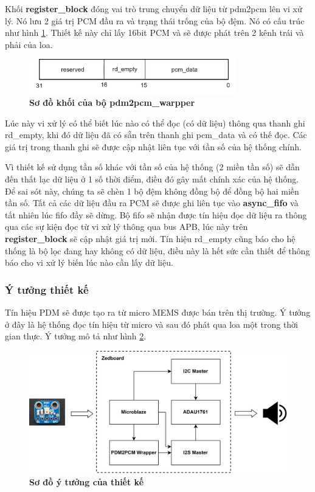 Khối \textbf{register\_block} đóng vai trò trung chuyển dữ liệu từ pdm2pcm lên vi xử lý. Nó lưu 2 giá trị PCM đầu ra và trạng thái trống của bộ đệm. Nó có cấu trúc như hình \ref{bit}. Thiết kế này chỉ lấy 16bit PCM và sẽ được phát trên 2 kênh trái và phải của loa.

\begin{figure}[H]
    \centering
    \includegraphics[width=9cm]{Images/Chuong5/fpga/bit.png}
    \caption[Sơ đồ khối của bộ pdm2pcm\_warpper]{\bfseries \fontsize{12pt}{0pt}\selectfont Sơ đồ khối của bộ pdm2pcm\_warpper}
    \label{bit}
\end{figure}

Lúc này vi xử lý có thể biết lúc nào có thể đọc (có dữ liệu) thông qua thanh ghi rd\_empty, khi đó dữ liệu đã có sẵn trên thanh ghi pcm\_data và có thế đọc. Các giá trị trong thanh ghi sẽ được cập nhật liên tục với tần số của hệ thống chính.

Vì thiết kế sử dụng tần số khác với tần số của hệ thống (2 miền tần số) sẽ dẫn đến thất lạc dữ liệu ở 1 số thời điểm, điều đó gây mất chính xác của hệ thống. Để  sai sót này, chúng ta sẽ chèn 1 bộ đệm không đồng bộ để đồng bộ hai miền tần số. Tất cả các dữ liệu đầu ra PCM sẽ được ghi liên tục vào \textbf{async\_fifo} và tất nhiên lúc fifo đầy sẽ dừng. Bộ fifo sẽ nhận được tín hiệu đọc dữ liệu ra thông qua các sự kiện đọc từ vi xử lý thông qua bus APB, lúc này trên \textbf{register\_block} sẽ cập nhật giá trị mới. Tín hiệu rd\_empty cũng báo cho hệ thống là bộ lọc đang hay không có dữ liệu, điều này là hết sức cần thiết để thông báo cho vi xử lý biến lúc nào cần lấy dữ liệu.

\subsubsection{Ý tưởng thiết kế}

Tín hiệu PDM sẽ được tạo ra từ micro MEMS được bán trên thị trường. Ý tưởng ở đây là hệ thống đọc tín hiệu từ micro và sau đó phát qua loa một trong thời gian thực.
Ý tưởng mô tả như hình \ref{pinouts}.
\begin{figure}[H]
    \centering
    \includegraphics[width=14cm]{Images/Chuong5/fpga/top.png}
    \caption[Sơ đồ ý tưởng của thiết kế]{\bfseries \fontsize{12pt}{0pt}\selectfont Sơ đồ ý tưởng của thiết kế}
    \label{pinouts}
\end{figure}

